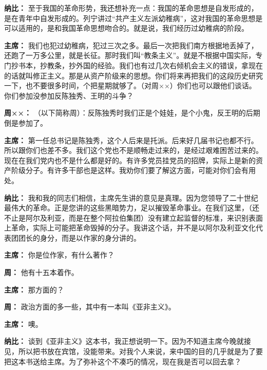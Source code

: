 \begin{duihua}
\item[\textbf{纳比：}] 至于我国的革命形势，我还想补充一点：我国的革命思想是自发形成的，是在青年中自发形成的。列宁讲过“共产主义左派幼稚病”，这对我国的革命思想是可以适用的，是和我国革命思想吻合的。就是说，我们经历过幼稚病的阶段。

\item[\textbf{主席：}] 我们也犯过幼稚病，犯过三次之多。最后一次把我们南方根据地丢掉了，还跑了一万多公里，就是长征。那时我们叫“教条主义”。就是不根据中国实际，专门抄书本，抄教条，抄外国的经验。我们也有过几次右倾机会主义的错误，拿现在的话就叫修正主义。那是从资产阶级来的思想。你们将来再把我们的这段历史研究一下，也不要很多时间，个把星期就够了。（对周××）你们也可以跟他们谈话。你们参加没参加反陈独秀、王明的斗争？

\item[\textbf{周××：}] （以下简称周）：反陈独秀时我们正是个娃娃，是个小鬼，反王明的后期倒是参加了。

\item[\textbf{主席：}] 第一任总书记是陈独秀，这个人后来是托派。后来好几届书记也都不行。所以跟你们也差不多。我们这个党也不是顺畅走过来的，是经过艰难困苦过来的。现在在我们党内也不是什么都是好的。有许多党员挂党员的招牌，实际上是新的资产阶级分子。有许多干部也是这样。我劝你们要了解这方面，可能对你们会有用处。

\item[\textbf{纳比：}] 我和我的同志们相信，主席先生讲的意见是真理。因为您领导了二十世纪最伟大的革命。正是您讲的这些黑暗势力，足以摧毁革命事业。在我们这里，（还不止是阿尔及利亚，而是在整个阿拉伯集团）没有建立起监督的标准，来识别表面上革命，实际上可能把革命毁掉的分子。我讲这个话，并不是以阿尔及利亚文化代表团团长的身分，而是以作家的身分讲的。

\item[\textbf{主席：}] 你是位作家，有什么著作？

\item[\textbf{周：}] 他有十五本着作。

\item[\textbf{主席：}] 那方面的？

\item[\textbf{周：}] 政治方面的多一些，其中有一本叫《亚非主义》。

\item[\textbf{主席：}] 噢。

\item[\textbf{纳比：}] 谈到《亚非主义》这本书，我正想说明一下。因为不知道主席今晚就接见，所以把书放在宾馆，没能带来。对我个人来说，来中国的目的几乎就是为了要把这本书送给主席。为了弥补这个不凑巧的情况，现在我是否可以回去拿？


\end{duihua}
